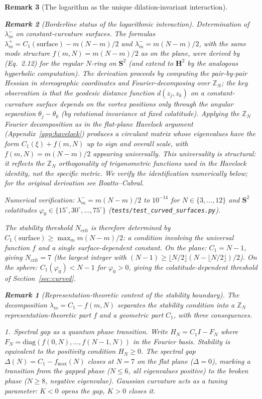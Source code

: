 \documentclass[12pt, a4paper]{article}
\newtheorem{remark}{Remark}[section]
\numberwithin{equation}{section}
\begin{document}
\begin{remark}[The logarithm as the unique dilation-invariant interaction]
\begin{remark}[Borderline status of the logarithmic interaction]
\smallskip
\noindent\emph{Determination of $\lambda_m^-$ on constant-curvature
surfaces.}
The formulas $\lambda_m^+ = C_1(\mathrm{surface}) - m(N{-}m)/2$
and $\lambda_m^- = m(N{-}m)/2$, with the same mode structure
$f(m, N) = m(N{-}m)/2$ as on the plane, were derived by
\citet{BoattoCabral2003} (Eq.~2.12) for the regular $N$-ring on
$\mathbf{S}^2$ (and extend to $\mathbf{H}^2$ by the analogous
hyperbolic computation).  The derivation proceeds by computing
the pair-by-pair Hessian in stereographic coordinates and
Fourier-decomposing over $\mathbb{Z}_N$; the key observation is
that the geodesic distance function $d(z_j, z_k)$ on a
constant-curvature surface depends on the vortex positions only
through the angular separation $\theta_j - \theta_k$ (by
rotational invariance at fixed colatitude).  Applying the
$\mathbb{Z}_N$ Fourier decomposition as in the flat-plane
Havelock argument (Appendix~\ref{app:havelock}) produces a
circulant matrix whose eigenvalues have the form $C_1(\xi)
+ f(m, N)$ up to sign and overall scale, with $f(m, N) =
m(N{-}m)/2$ appearing universally.  This universality is
structural: it reflects the $\mathbb{Z}_N$ orthogonality of
trigonometric functions used in the Havelock identity, not the
specific metric.  We verify the identification numerically
below; for the original derivation see Boatto--Cabral.

Numerical verification: $\lambda_m^- = m(N{-}m)/2$ to $10^{-14}$
for $N \in \{3, \ldots, 12\}$ and $\mathbf{S}^2$ colatitudes
$\varphi_0 \in \{15^\circ, 30^\circ, \ldots, 75^\circ\}$
(\texttt{tests/test\_curved\_surfaces.py}).

The stability threshold $N_{\mathrm{crit}}$ is therefore determined by
$C_1(\text{surface}) \ge \max_m m(N{-}m)/2$: a condition involving the
\emph{universal} function $f$ and a single surface-dependent constant.
On the plane: $C_1 = N{-}1$, giving $N_{\mathrm{crit}} = 7$ (the
largest integer with $(N{-}1) \ge \lfloor N/2\rfloor(N{-}\lfloor
N/2\rfloor)/2$).  On the sphere:
$C_1(\varphi_0) < N{-}1$ for $\varphi_0 > 0$, giving the
colatitude-dependent threshold of Section~\ref{sec:curved}.

\begin{remark}[Representation-theoretic content of the stability boundary]
\label{rem:rep-theory}
The decomposition $\lambda_m = C_1 - f(m,N)$ separates the stability
condition into a $\mathbb{Z}_N$ representation-theoretic part $f$ and
a geometric part $C_1$, with three consequences.

\emph{1.\ Spectral gap as a quantum phase transition.}
Write $H_N = C_1 I - F_N$ where $F_N = \mathrm{diag}(f(0,N),
\ldots, f(N{-}1,N))$ in the Fourier basis.  Stability is equivalent
to the positivity condition $H_N \ge 0$.  The spectral gap
$\Delta(N) = C_1 - f_{\max}(N)$ closes at $N = 7$ on the flat
plane ($\Delta = 0$), marking a transition from the gapped phase
($N \le 6$, all eigenvalues positive) to the broken phase
($N \ge 8$, negative eigenvalue).  Gaussian curvature acts as
a tuning parameter: $K < 0$ opens the gap, $K > 0$ closes it.


\end{remark}
\end{remark}
\end{remark}
\end{document}
